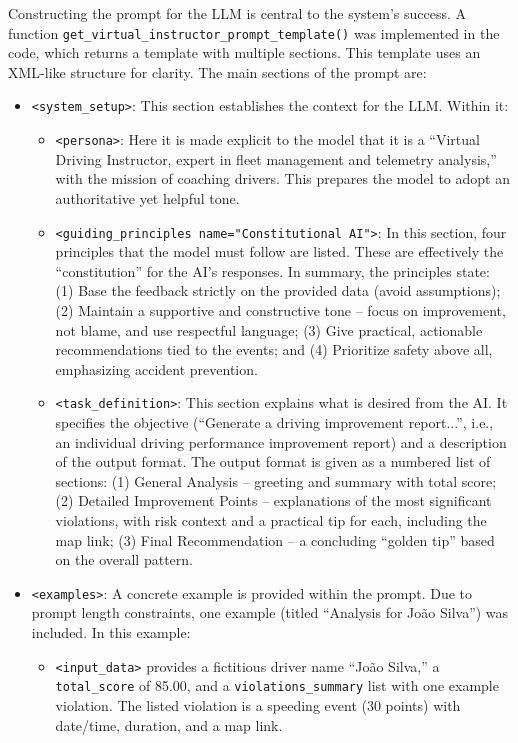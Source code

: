 \documentclass[12pt]{article}
\begin{document}
Constructing the prompt for the LLM is central to the system’s success. A function \verb|get_virtual_instructor_prompt_template()| was implemented in the code, which returns a template with multiple sections. This template uses an XML-like structure for clarity. The main sections of the prompt are:

\begin{itemize}
    \item \verb|<system_setup>|: This section establishes the context for the LLM. Within it:
    \begin{itemize}
        \item \verb|<persona>|: Here it is made explicit to the model that it is a “Virtual Driving Instructor, expert in fleet management and telemetry analysis,” with the mission of coaching drivers. This prepares the model to adopt an authoritative yet helpful tone.
        \item \verb|<guiding_principles name="Constitutional AI">|: In this section, four principles that the model must follow are listed. These are effectively the “constitution” for the AI’s responses. In summary, the principles state: (1) Base the feedback strictly on the provided data (avoid assumptions); (2) Maintain a supportive and constructive tone – focus on improvement, not blame, and use respectful language; (3) Give practical, actionable recommendations tied to the events; and (4) Prioritize safety above all, emphasizing accident prevention.
        \item \verb|<task_definition>|: This section explains what is desired from the AI. It specifies the objective (“Generate a driving improvement report...”, i.e., an individual driving performance improvement report) and a description of the output format. The output format is given as a numbered list of sections: (1) General Analysis – greeting and summary with total score; (2) Detailed Improvement Points – explanations of the most significant violations, with risk context and a practical tip for each, including the map link; (3) Final Recommendation – a concluding “golden tip” based on the overall pattern.
    \end{itemize}
    \item \verb|<examples>|: A concrete example is provided within the prompt. Due to prompt length constraints, one example (titled “Analysis for João Silva”) was included. In this example:
    \begin{itemize}
        \item \verb|<input_data>| provides a fictitious driver name “João Silva,” a \verb|total_score| of 85.00, and a \verb|violations_summary| list with one example violation. The listed violation is a speeding event (30 points) with date/time, duration, and a map link.

\end{itemize}
\end{itemize}
\end{document}
